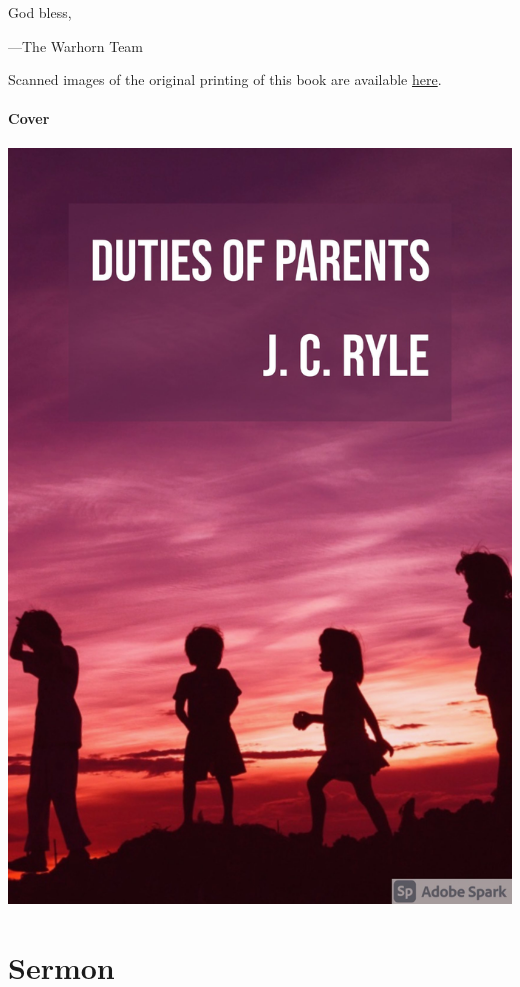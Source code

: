 \documentclass[
]{book}
\begin{document}
God bless,

---The Warhorn Team

Scanned images of the original printing of this book are available \href{https://www.google.com/books/edition/Wheat_Or_Chaff/il5QAQAAMAAJ?hl=en\&gbpv=1\&pg=PA219\&printsec=frontcover}{here}.

\hypertarget{cover}{%
\subsubsection*{Cover}\label{cover}}

\includegraphics{cover.jpg}

\hypertarget{sermon}{%
\chapter*{Sermon}\label{sermon}}
\end{document}
